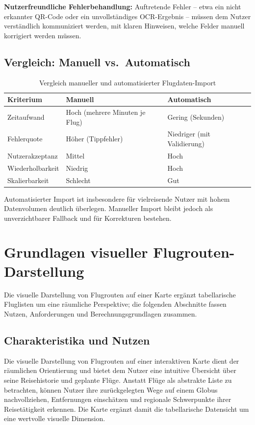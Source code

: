 \textbf{Nutzerfreundliche Fehlerbehandlung:} Auftretende Fehler -- etwa ein nicht erkannter QR-Code oder ein unvollständiges OCR-Ergebnis -- müssen dem Nutzer verständlich kommuniziert werden, mit klaren Hinweisen, welche Felder manuell korrigiert werden müssen.

\subsection{Vergleich: Manuell vs.\ Automatisch}

\begin{table}[H]
  \centering
  \caption{Vergleich manueller und automatisierter Flugdaten-Import}
  \label{tab:import_vergleich}
  \begin{tabular}{p{4.5cm}p{4.2cm}p{4.2cm}}
    \toprule
    \textbf{Kriterium} & \textbf{Manuell} & \textbf{Automatisch} \\
    \midrule
    Zeitaufwand & Hoch (mehrere Minuten je Flug) & Gering (Sekunden) \\
    Fehlerquote & Höher (Tippfehler) & Niedriger (mit Validierung) \\
    Nutzerakzeptanz & Mittel & Hoch \\
    Wiederholbarkeit & Niedrig & Hoch \\
    Skalierbarkeit & Schlecht & Gut \\
    \bottomrule
  \end{tabular}
\end{table}

Automatisierter Import ist insbesondere für vielreisende Nutzer mit hohem Datenvolumen deutlich überlegen.
Manueller Import bleibt jedoch als unverzichtbarer Fallback und für Korrekturen bestehen.

\section{Grundlagen visueller Flugrouten-Darstellung}

Die visuelle Darstellung von Flugrouten auf einer Karte ergänzt tabellarische Fluglisten um eine räumliche Perspektive; die folgenden Abschnitte fassen Nutzen, Anforderungen und Berechnungsgrundlagen zusammen.

\subsection{Charakteristika und Nutzen}

Die visuelle Darstellung von Flugrouten auf einer interaktiven Karte dient der räumlichen Orientierung und bietet dem Nutzer eine intuitive Übersicht über seine Reisehistorie und geplante Flüge.
Anstatt Flüge als abstrakte Liste zu betrachten, können Nutzer ihre zurückgelegten Wege auf einem Globus nachvollziehen, Entfernungen einschätzen und regionale Schwerpunkte ihrer Reisetätigkeit erkennen.
Die Karte ergänzt damit die tabellarische Datensicht um eine wertvolle visuelle Dimension.

